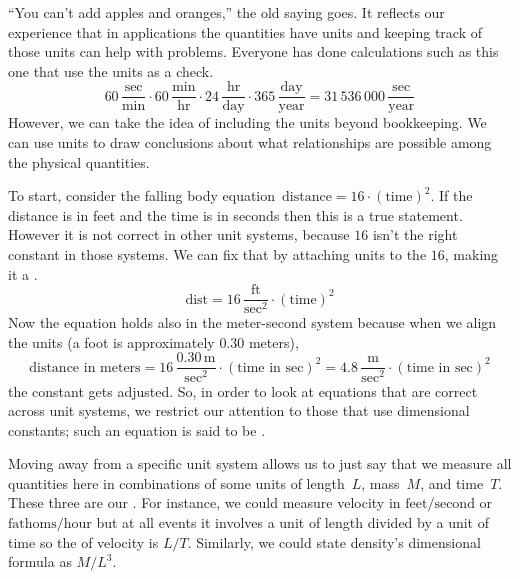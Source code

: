 ``You can't add apples and oranges,'' the old saying goes.
It reflects our experience that in applications the quantities
have units and keeping track of those units can help with problems.
Everyone has done calculations such as this one 
that use the units as a check.
\begin{equation*}
  60\,\frac{\text{sec}}{\text{min}}
  \cdot 60\,\frac{\text{min}}{\text{hr}}
  \cdot 24\,\frac{\text{hr}}{\text{day}}
  \cdot 365\,\frac{\text{day}}{\text{year}}
  = 31\,536\,000\,\frac{\text{sec}}{\text{year}}
\end{equation*}
However, we can take the idea of including the units beyond bookkeeping.
We can use units to draw conclusions
about what relationships are possible among the physical quantities.

To start, consider the falling body 
equation~$\text{distance}=16\cdot(\text{time})^2$.
If the distance is in feet and the time is in seconds then this is a 
true statement. 
However
it is not correct in other unit systems, because $16$ isn't the
right constant in those systems.  
We can fix that by attaching units to the $16$, making it a 
.
\begin{equation*}
  \text{dist}=16\,\frac{\text{ft}}{\text{sec}^2}\cdot (\text{time})^2
\end{equation*}  
Now the equation holds also in the meter-second system   
because when we align the units (a foot is approximately $0.30$ meters), 
\begin{equation*}
  \text{distance in meters}=16\,\frac{0.30\,\text{m}}{\text{sec}^2}
                    \cdot (\text{time in sec})^2
                   =4.8\,\frac{\text{m}}{\text{sec}^2}
                    \cdot (\text{time in sec})^2
\end{equation*}
the constant gets adjusted.
So, in order to look at equations that are correct across unit systems, 
we restrict our attention
to those that use dimensional constants; such
an equation is said to be .

Moving away from a specific unit system allows us to just say that 
we measure all quantities here in combinations
of some units of length~$L$, mass~$M$, and time~$T$.
These three are our
.
For instance, we could measure velocity 
in $\text{feet}/\text{second}$
or $\text{fathoms}/\text{hour}$ but at all events it involves
a unit of length divided by a unit of time
so the  
of velocity is $L/T$.
Similarly, we could state density's dimensional formula as $M/L^3$.

